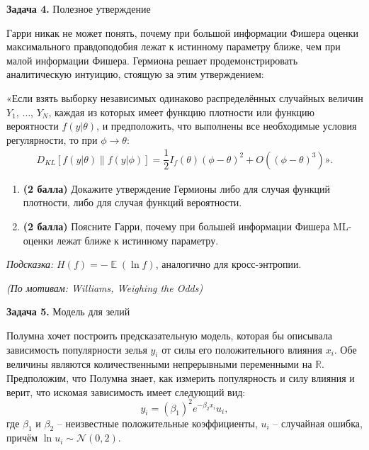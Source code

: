\documentclass[10pt, a4paper]{extarticle}
\DeclareMathOperator{\E}{\mathbb{E}}
\def \R{\mathbb{R}}
\begin{document}
	{\Large \textbf{Задача 4.} Полезное утверждение}
	
	Гарри никак не может понять, почему при большой информации Фишера оценки максимального правдоподобия лежат к истинному параметру ближе, чем при малой информации Фишера.
	Гермиона решает продемонстрировать аналитическую интуицию, стоящую за этим утверждением:
	
	«Если взять выборку независимых одинаково распределённых случайных величин $Y_1$, $\ldots$, $Y_N$, каждая из которых имеет функцию плотности или функцию вероятности $f(y | \theta)$, и предположить, что выполнены все необходимые условия регулярности, то при $\phi \to \theta$:
	\begin{align*}
	D_{KL}\left[f(y | \theta) \| f(y | \phi)\right] = \dfrac{1}{2} I_f(\theta)(\phi - \theta)^2 + O((\phi - \theta)^3)\text{»}.
	\end{align*}
	
	\begin{enumerate}
		\item \textbf{(2 балла)} Докажите утверждение Гермионы либо для случая функций плотности, либо для случая функций вероятности.
		\item \textbf{(2 балла)} Поясните Гарри, почему при большей информации Фишера ML-оценки лежат ближе к истинному параметру. 
	\end{enumerate}

	\textit{Подсказка:} $H(f) = -\E(\ln f)$, аналогично для кросс-энтропии.
	
	\begin{flushright}
		\textit{\small (По мотивам: Williams, Weighing the Odds)}
	\end{flushright}

	
	{\Large \textbf{Задача 5.} Модель для зелий}
	
	Полумна хочет построить предсказательную модель, которая бы описывала зависимость популярности зелья $y_i$ от силы его положительного влияния $x_i$.
	Обе величины являются количественными непрерывными переменными на $\R$.
	Предположим, что Полумна знает, как измерить популярность и силу влияния и верит, что искомая зависимость имеет следующий вид:
	\[
	y_i = (\beta_1)^2 e^{-\beta_2 x_i}u_i,
	\]
	где $\beta_1$ и $\beta_2$ -- неизвестные положительные коэффициенты, $u_i $ -- случайная ошибка, причём $\ln u_i \sim \mathcal{N}(0, 2)$.
	
\end{document}
